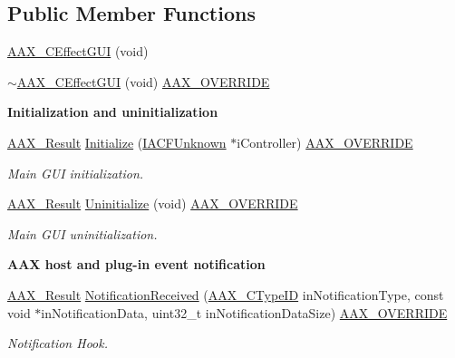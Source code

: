 \subsection*{Public Member Functions}
\begin{DoxyCompactItemize}
\item 
\mbox{\hyperlink{a01477_aff1112d89b87c0eaa94b9ed149134ce6}{A\+A\+X\+\_\+\+C\+Effect\+G\+UI}} (void)
\item 
\mbox{\hyperlink{a01477_a2cc9b45d561a1dee0b540ef771e5a016}{$\sim$\+A\+A\+X\+\_\+\+C\+Effect\+G\+UI}} (void) \mbox{\hyperlink{a00392_ac2f24a5172689ae684344abdcce55463}{A\+A\+X\+\_\+\+O\+V\+E\+R\+R\+I\+DE}}
\end{DoxyCompactItemize}
\begin{Indent}\textbf{ Initialization and uninitialization}\par
\begin{DoxyCompactItemize}
\item 
\mbox{\hyperlink{a00392_a4d8f69a697df7f70c3a8e9b8ee130d2f}{A\+A\+X\+\_\+\+Result}} \mbox{\hyperlink{a01477_a5fcb43bfa54847abe95c2ff76cc6cb13}{Initialize}} (\mbox{\hyperlink{a01409}{I\+A\+C\+F\+Unknown}} $\ast$i\+Controller) \mbox{\hyperlink{a00392_ac2f24a5172689ae684344abdcce55463}{A\+A\+X\+\_\+\+O\+V\+E\+R\+R\+I\+DE}}
\begin{DoxyCompactList}\small\item\em Main G\+UI initialization. \end{DoxyCompactList}\item 
\mbox{\hyperlink{a00392_a4d8f69a697df7f70c3a8e9b8ee130d2f}{A\+A\+X\+\_\+\+Result}} \mbox{\hyperlink{a01477_a7d3230457433a1a8204114e57fef7bef}{Uninitialize}} (void) \mbox{\hyperlink{a00392_ac2f24a5172689ae684344abdcce55463}{A\+A\+X\+\_\+\+O\+V\+E\+R\+R\+I\+DE}}
\begin{DoxyCompactList}\small\item\em Main G\+UI uninitialization. \end{DoxyCompactList}\end{DoxyCompactItemize}
\end{Indent}
\begin{Indent}\textbf{ A\+AX host and plug-\/in event notification}\par
\begin{DoxyCompactItemize}
\item 
\mbox{\hyperlink{a00392_a4d8f69a697df7f70c3a8e9b8ee130d2f}{A\+A\+X\+\_\+\+Result}} \mbox{\hyperlink{a01477_af00b27d16a45bccf632a445491c56833}{Notification\+Received}} (\mbox{\hyperlink{a00392_ac678f9c1fbcc26315d209f71a147a175}{A\+A\+X\+\_\+\+C\+Type\+ID}} in\+Notification\+Type, const void $\ast$in\+Notification\+Data, uint32\+\_\+t in\+Notification\+Data\+Size) \mbox{\hyperlink{a00392_ac2f24a5172689ae684344abdcce55463}{A\+A\+X\+\_\+\+O\+V\+E\+R\+R\+I\+DE}}
\begin{DoxyCompactList}\small\item\em Notification Hook. \end{DoxyCompactList}\end{DoxyCompactItemize}
\end{Indent}
